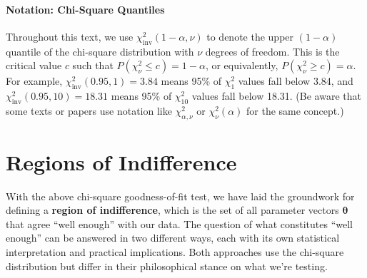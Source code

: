 \paragraph*{Notation: Chi-Square Quantiles}
Throughout this text, we use $\chi^2_{\text{inv}}(1-\alpha, \nu)$ to denote the upper $(1-\alpha)$ quantile of the chi-square distribution with $\nu$ degrees of freedom. This is the critical value $c$ such that $P(\chi^2_\nu \le c) = 1-\alpha$, or equivalently, $P(\chi^2_\nu \ge c) = \alpha$. For example, $\chi^2_{\text{inv}}(0.95, 1) = 3.84$ means 95\% of $\chi^2_1$ values fall below 3.84, and $\chi^2_{\text{inv}}(0.95, 10) = 18.31$ means 95\% of $\chi^2_{10}$ values fall below 18.31. (Be aware that some texts or papers use notation like $\chi^2_{\alpha,\nu}$ or $\chi^2_{\nu}(\alpha)$ for the same concept.)


\section{Regions of Indifference}
With the above chi-square goodness-of-fit test, we have laid the groundwork for defining a \textbf{region of indifference}, which is the set of all parameter vectors $\boldsymbol{\theta}$ that agree ``well enough'' with our data. The question of what constitutes ``well enough'' can be answered in two different ways, each with its own statistical interpretation and practical implications. Both approaches use the chi-square distribution but differ in their philosophical stance on what we're testing.

